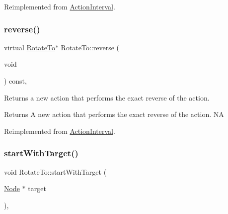 Reimplemented from \hyperlink{classActionInterval_a9f9ac7164036a0bc261a72f62a2b2da7}{Action\+Interval}.

\mbox{\label{classRotateTo_a5bf82cc4eb140e90ff0e2da8b8dd7a7f}} 
\subsubsection{\texorpdfstring{reverse()}{reverse()}\hspace{0.1cm}{\footnotesize\ttfamily [2/2]}}
{\footnotesize\ttfamily virtual \hyperlink{classRotateTo}{Rotate\+To}$\ast$ Rotate\+To\+::reverse (\begin{DoxyParamCaption}\item[{void}]{ }\end{DoxyParamCaption}) const\hspace{0.3cm}{\ttfamily [override]}, {\ttfamily [virtual]}}

Returns a new action that performs the exact reverse of the action.

\begin{DoxyReturn}{Returns}
A new action that performs the exact reverse of the action.  NA 
\end{DoxyReturn}


Reimplemented from \hyperlink{classActionInterval_a9f9ac7164036a0bc261a72f62a2b2da7}{Action\+Interval}.

\mbox{\label{classRotateTo_a6d31ab7382b1d028b533d89dd1ca1980}} 
\subsubsection{\texorpdfstring{start\+With\+Target()}{startWithTarget()}\hspace{0.1cm}{\footnotesize\ttfamily [1/2]}}
{\footnotesize\ttfamily void Rotate\+To\+::start\+With\+Target (\begin{DoxyParamCaption}\item[{\hyperlink{classNode}{Node} $\ast$}]{target }\end{DoxyParamCaption})\hspace{0.3cm}{\ttfamily [override]}, {\ttfamily [virtual]}}

